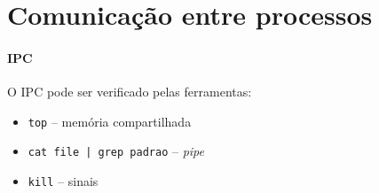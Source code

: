 \section*{Comunicação entre processos}

\paragraph{IPC} O IPC pode ser verificado pelas ferramentas:

\begin{itemize}
\item {\tt top} -- memória compartilhada
\item {\tt cat file | grep padrao} -- {\em pipe}
\item {\tt kill} -- sinais
\end{itemize}
